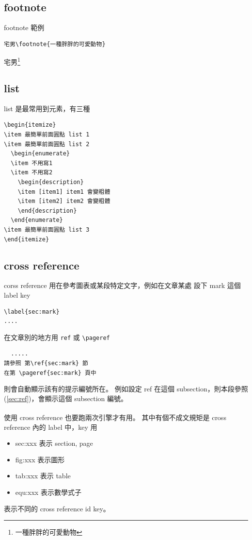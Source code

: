   \subsection{footnote}
  footnote 範例
  \begin{verbatim}
宅男\footnote{一種胖胖的可愛動物}
  \end{verbatim}
  宅男\footnote{一種胖胖的可愛動物}

  \subsection{list}
  list 是最常用到元素，有三種
  \begin{verbatim}
\begin{itemize}
\item 最簡單前面圓點 list 1
\item 最簡單前面圓點 list 2
  \begin{enumerate}
  \item 不用寫1
  \item 不用寫2
    \begin{description}
    \item [item1] item1 會變粗體
    \item [item2] item2 會變粗體
    \end{description}
  \end{enumerate}
\item 最簡單前面圓點 list 3
\end{itemize}
  \end{verbatim}

  \subsection{cross reference}
  corss reference \label{sec:ref} 用在參考圖表或某段特定文字，例如在文章某處
  設下 mark 這個 label key
  \begin{verbatim}
\label{sec:mark}
....
  \end{verbatim}
  在文章別的地方用 \verb=ref= 或 \verb=\pageref=
  \begin{verbatim}
  .....
請參照 第\ref{sec:mark} 節
在第 \pageref{sec:mark} 頁中
  \end{verbatim}
  則會自動顯示該有的提示編號所在。 例如設定 ref 在這個 subsection，則本段參照
  (\ref{sec:ref})，會顯示這個 subsection 編號。
  \\\\
  使用 cross reference 也要跑兩次引擎才有用。 其中有個不成文規矩是 cross
  reference 內的 label 中，key 用
  \begin{itemize}
    \item sec:xxx 表示 section, page
    \item fig:xxx 表示圖形
    \item tab:xxx 表示 table
    \item equ:xxx 表示數學式子
  \end{itemize}
  表示不同的 cross reference id key。

